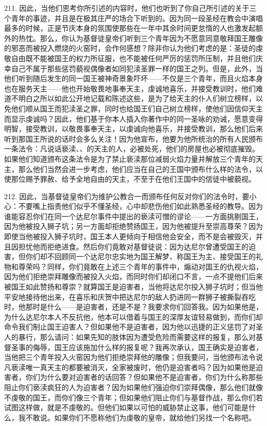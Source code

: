 211. 因此，当他们思考你所引述的内容时，他们也听到了你自己所引述的关于三个青年的事迹，并且是在极其庄严的场合下听到的。因为同一段圣经在教会中演唱最多的时候，正是节庆本身的氛围使那些在一年中其余时间更怠惰的人也激发起额外的热忱。那么，你认为基督徒皇帝们听到三个青年因为不愿意同意敬拜国王雕像的邪恶而被投入燃烧的火窑时，会作何感想？除非你认为他们考虑的是：圣徒的虔敬自由既不能被国王的权力所征服，也不能被任何严厉的惩罚所压制，并且他们庆幸自己不属于那些惩罚藐视偶像者如同犯渎圣罪一样的国王之列。但是，此外，当他们听到随后发生的同一国王被神奇景象吓坏——不仅是三个青年，而且火焰本身也在服务天主——他也开始敬畏地事奉天主，虔诚地喜乐，并接受教训时，他们难道不明白之所以如此公开地记载和陈述这些，是为了给天主的仆人们树立榜样，以免他们顺从国王而犯渎圣之罪，同时也给国王们自己树立榜样，使他们因信仰天主而显示虔诚吗？因此，他们基于你本人插入你著作中的同一圣咏的劝诫，愿意变得明智，接受教训，以敬畏事奉天主，以虔诚向他喜乐，并接受教训，那么他们后来听到那国王所说的话时会多么关注！因为他宣布，他要为他所统治的所有人民颁布一条法令：凡说话亵渎、、的天主的人，必被处死，他们的房屋也必被彻底摧毁。如果他们知道颁布这条法令是为了禁止亵渎那位减弱火焰力量并解放三个青年的天主，那么他们当然会进一步考虑，他们应当在自己的王国中颁布什么样的法令，以使那位赐予罪赦、给予全地自由的天主，不至于在他们王国中的信徒中被藐视。\par

212. 因此，当基督徒皇帝们为维护公教合一而颁布任何反对你们的法令时，要小心：不要嘴上指责他们似乎不懂圣经，心中却悲伤他们如此熟悉圣经的教导。因为谁能容忍你们在同一个达尼尔事件中提出的亵渎可憎的谬论——一方面挑剔国王，因为他被投入狮子坑；另一方面却拒绝赞扬国王，因为他被提升至崇高尊荣？因为即使当他被投入狮子坑时，国王本人更倾向于相信他会安全，而不是会被毁灭，并且因担忧他而拒绝进食。然后你们竟敢对基督徒说：因为达尼尔曾遭受国王的迫害，但你们却不回顾同一个达尼尔忠实地为国王解梦、称国王为主、接受国王的礼物和尊荣吗？同样，你们竟敢在上述三个青年的事件中，煽动对国王的仇视火焰，因为他们拒绝崇拜雕像而被投入火焰，而同时你们却闭口不言，一点不提他们后来被国王如此赞扬和尊崇？就算国王是迫害者，当他将达尼尔投入狮子坑时；但当他平安地接待他出来，在喜乐和庆贺中把达尼尔的敌人扔进同一群狮子被撕裂吞吃时，他那时是什么——是迫害者，还是不是？我要求你们回答我。因为如果他是，为什么达尼尔本人不反抗他，他本可以借着与国王的深厚友谊轻易做到，而你们却命令我们制止国王迫害人？但如果他不是迫害者，因为他以迅捷的正义惩罚了对圣人的暴行，那么请问：如果先知的肢体因为遭受危险而需要这样的报复，那么对基督圣事的侮辱，国王应该施加什么样的报复呢？我再次承认，国王确实是迫害者，当他把三个青年投入火窑因为他们拒绝崇拜他的雕像；但我要问，当他颁布法令说凡亵渎唯一真天主的都要被消灭，全家被废时，他仍是迫害者吗？因为如果他是迫害者，你们为什么要对迫害者的话回答？但如果他不是迫害者，你们为什么称那些阻止你们亵渎疯狂的人为迫害者？因为如果他们强迫你们崇拜偶像，那么他们就像不虔敬的国王，而你们像三个青年；但如果他们阻止你们与基督作战，那么你们若试图这样做，就是不虔敬的。但他们如果以可怕的威胁禁止这事，他们可能是什么，我不敢说。如果你们不愿称他们为虔敬的皇帝，就给他们另找一个名称吧。\par

